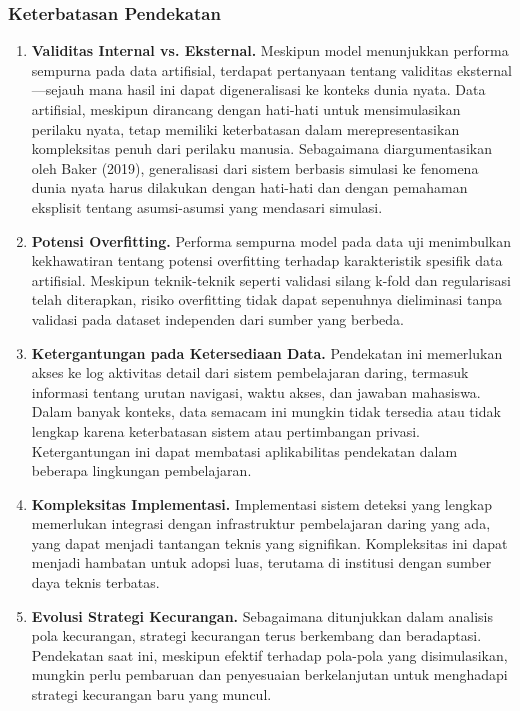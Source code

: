 \subsubsection{Keterbatasan Pendekatan}

\begin{enumerate}
    \item \textbf{Validitas Internal vs. Eksternal.} Meskipun model menunjukkan performa sempurna pada data artifisial, terdapat pertanyaan tentang validitas eksternal—sejauh mana hasil ini dapat digeneralisasi ke konteks dunia nyata. Data artifisial, meskipun dirancang dengan hati-hati untuk mensimulasikan perilaku nyata, tetap memiliki keterbatasan dalam merepresentasikan kompleksitas penuh dari perilaku manusia. Sebagaimana diargumentasikan oleh Baker (2019), generalisasi dari sistem berbasis simulasi ke fenomena dunia nyata harus dilakukan dengan hati-hati dan dengan pemahaman eksplisit tentang asumsi-asumsi yang mendasari simulasi.
    
    \item \textbf{Potensi Overfitting.} Performa sempurna model pada data uji menimbulkan kekhawatiran tentang potensi overfitting terhadap karakteristik spesifik data artifisial. Meskipun teknik-teknik seperti validasi silang k-fold dan regularisasi telah diterapkan, risiko overfitting tidak dapat sepenuhnya dieliminasi tanpa validasi pada dataset independen dari sumber yang berbeda.
    
    \item \textbf{Ketergantungan pada Ketersediaan Data.} Pendekatan ini memerlukan akses ke log aktivitas detail dari sistem pembelajaran daring, termasuk informasi tentang urutan navigasi, waktu akses, dan jawaban mahasiswa. Dalam banyak konteks, data semacam ini mungkin tidak tersedia atau tidak lengkap karena keterbatasan sistem atau pertimbangan privasi. Ketergantungan ini dapat membatasi aplikabilitas pendekatan dalam beberapa lingkungan pembelajaran.
    
    \item \textbf{Kompleksitas Implementasi.} Implementasi sistem deteksi yang lengkap memerlukan integrasi dengan infrastruktur pembelajaran daring yang ada, yang dapat menjadi tantangan teknis yang signifikan. Kompleksitas ini dapat menjadi hambatan untuk adopsi luas, terutama di institusi dengan sumber daya teknis terbatas.
    
    \item \textbf{Evolusi Strategi Kecurangan.} Sebagaimana ditunjukkan dalam analisis pola kecurangan, strategi kecurangan terus berkembang dan beradaptasi. Pendekatan saat ini, meskipun efektif terhadap pola-pola yang disimulasikan, mungkin perlu pembaruan dan penyesuaian berkelanjutan untuk menghadapi strategi kecurangan baru yang muncul.
\end{enumerate}

